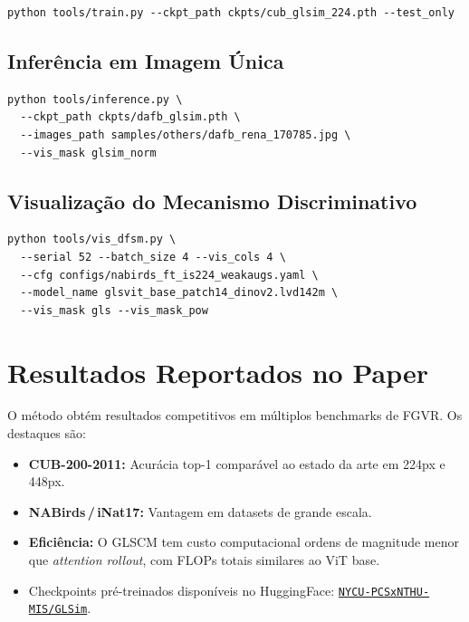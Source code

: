 \documentclass[a4paper,12pt]{scrartcl}
\newenvironment{compactitem}%
  {\begin{itemize}\setlength{\itemsep}{1pt}\setlength{\parsep}{0pt}}%
  {\end{itemize}}
\begin{document}
\begin{lstlisting}[style=bashstyle,
  caption={Avalia\c{c}\~ao de um checkpoint salvo}]
python tools/train.py --ckpt_path ckpts/cub_glsim_224.pth --test_only
\end{lstlisting}

\subsection{Infer\^encia em Imagem \'Unica}

\begin{lstlisting}[style=bashstyle,
  caption={Infer\^encia com visualiza\c{c}\~ao do recorte discriminativo}]
python tools/inference.py \
  --ckpt_path ckpts/dafb_glsim.pth \
  --images_path samples/others/dafb_rena_170785.jpg \
  --vis_mask glsim_norm
\end{lstlisting}

\subsection{Visualiza\c{c}\~ao do Mecanismo Discriminativo}

\begin{lstlisting}[style=bashstyle,
  caption={Visualiza\c{c}\~ao do GLSCM em lote (NABirds + DINOv2)}]
python tools/vis_dfsm.py \
  --serial 52 --batch_size 4 --vis_cols 4 \
  --cfg configs/nabirds_ft_is224_weakaugs.yaml \
  --model_name glsvit_base_patch14_dinov2.lvd142m \
  --vis_mask gls --vis_mask_pow
\end{lstlisting}

\section{Resultados Reportados no Paper}

O m\'etodo obt\'em resultados competitivos em m\'ultiplos benchmarks de FGVR.
Os destaques s\~ao:

\begin{compactitem}
  \item \textbf{CUB-200-2011:} Acur\'acia top-1 compar\'avel ao estado da
        arte em 224px e 448px.
  \item \textbf{NABirds\,/\,iNat17:} Vantagem em datasets de grande escala.
  \item \textbf{Efici\^encia:} O GLSCM tem custo computacional ordens de
        magnitude menor que \textit{attention rollout}, com FLOPs totais
        similares ao ViT base.
  \item Checkpoints pr\'e-treinados dispon\'iveis no HuggingFace:
        \href{https://huggingface.co/NYCU-PCSxNTHU-MIS/GLSim}%
             {\texttt{NYCU-PCSxNTHU-MIS/GLSim}}.
\end{compactitem}
\end{document}
